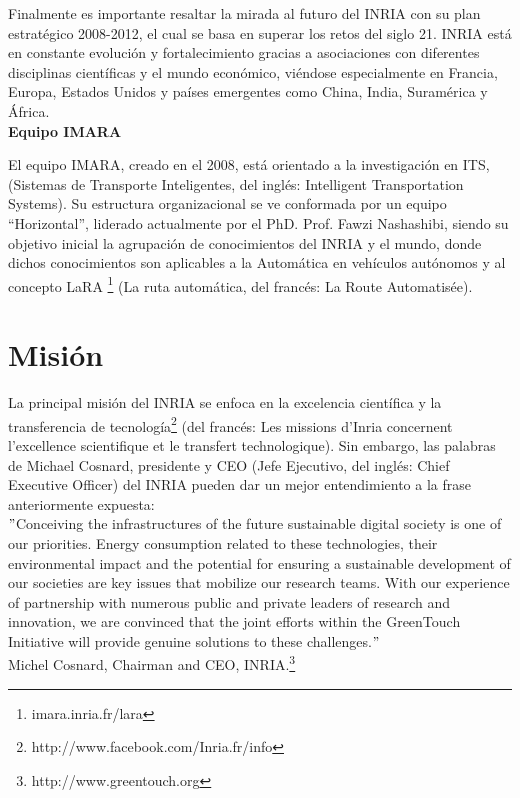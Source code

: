 Finalmente es importante resaltar la mirada al futuro del INRIA con su plan estratégico 2008-2012, el cual se basa en superar los retos del siglo 21. INRIA está en constante evolución y fortalecimiento gracias a asociaciones con diferentes disciplinas científicas y el mundo económico, viéndose especialmente en Francia, Europa, Estados Unidos y países emergentes como China, India, Suramérica y África.\\

\noindent
\textbf{Equipo IMARA}

El equipo IMARA, creado en el 2008, está orientado a la investigación en ITS, (Sistemas de Transporte Inteligentes, del inglés: Intelligent Transportation Systems). Su estructura organizacional se ve conformada por un equipo “Horizontal”, liderado actualmente por el PhD. Prof. Fawzi Nashashibi, siendo su objetivo inicial la agrupación de conocimientos del INRIA y el mundo, donde dichos conocimientos son aplicables a la Automática en vehículos autónomos y al concepto LaRA \footnote{imara.inria.fr/lara} (La ruta automática, del francés: La Route Automatisée).

\section{Misión}

La principal misión del INRIA se enfoca en la excelencia científica y la transferencia de tecnología\footnote{http://www.facebook.com/Inria.fr/info} (del francés: Les missions d'Inria concernent l'excellence scientifique et le transfert technologique). Sin embargo, las palabras de Michael Cosnard, presidente y CEO (Jefe Ejecutivo, del inglés: Chief Executive Officer) del INRIA pueden dar un mejor entendimiento a la frase anteriormente expuesta:\\

$"$Conceiving the infrastructures of the future sustainable digital society is one of our priorities. Energy consumption related to these technologies, their environmental impact and the potential for ensuring a sustainable development of our societies are key issues that mobilize our research teams. With our experience of partnership with numerous public and private leaders of research and innovation, we are convinced that the joint efforts within the GreenTouch Initiative will provide genuine solutions to these challenges.$"$\\

Michel Cosnard, Chairman and CEO, INRIA.\footnote{http://www.greentouch.org}\\

